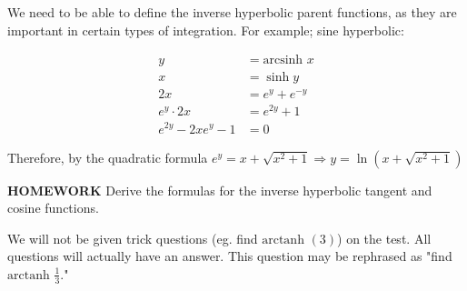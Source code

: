 \documentclass{article}
\begin{document}
\begin{center}
\end{center}

\vspace{10pt}

We need to be able to define the inverse hyperbolic parent functions, as they are important in certain types of integration. For example; sine hyperbolic:

\begin{align*}
y&=\mbox{arcsinh } x\\
x&=\sinh y\\
2x&=e^y+e^{-y}\\
e^y\cdot2x&=e^{2y}+1\\
e^{2y}-2xe^y-1&=0
\end{align*}

\vspace{10pt}

Therefore, by the quadratic formula $e^y=x+\sqrt{x^2+1}\Rightarrow y=\ln(x+\sqrt{x^2+1})$

\vspace{10pt}

{\bf{}HOMEWORK} Derive the formulas for the inverse hyperbolic tangent and cosine functions.

\vspace{10pt}

We will not be given trick questions (eg. find $\mbox{arctanh }(3)$) on the test. All questions will actually have an answer. This question may be rephrased as "find $\mbox{arctanh }\frac{1}{3}$."
\end{document}
